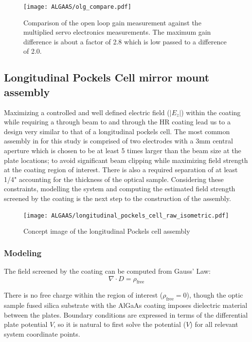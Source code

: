 \begin{figure}[H]
\begin{center}
\texttt{[image: ALGAAS/olg\_compare.pdf]}
\end{center}
\caption{Comparison of the open loop gain measurement against the multiplied servo electronics measurements. The maximum gain difference is about a factor of 2.8 which is low passed to a difference of 2.0.}
\label{fig:OLGcompare}
\end{figure}

\subsection{Longitudinal Pockels Cell mirror mount assembly}
Maximizing a controlled and well defined electric field ($|E_z|$) within the coating while requiring a through beam to and through the HR coating lead us to a design very similar to that of a longitudinal pockels cell. The most common assembly in for this study is comprised of two electrodes with a 3mm central aperture which is chosen to be at least 5 times larger than the beam size at the plate locations; to avoid significant beam clipping while maximizing field strength at the coating region of interest. There is also a required separation of at least 1/4" accounting for the thickness of the optical sample. Considering these constraints, modelling the system and computing the estimated field strength screened by the coating is the next step to the construction of the assembly.

\begin{figure}[H]
\begin{center}
\texttt{[image: ALGAAS/longitudinal\_pockels\_cell\_raw\_isometric.pdf]}
\end{center}
\caption{Concept image of the longitudinal Pockels cell assembly}
\label{fig:pckcellconcept}
\end{figure}

\subsubsection{Modeling}
The field screened by the coating can be computed from Gauss' Law:
\begin{equation}
\nabla \cdot D = \rho_\mathrm{free}
\end{equation}

\noindent There is no free charge within the region of interest ($\rho_\mathrm{free}=0$), though the optic sample fused silica substrate with the AlGaAs coating imposes dielectric material between the plates. Boundary conditions are expressed in terms of the differential plate potential $V$, so it is natural to first solve the potential ($V$) for all relevant system coordinate points.  

